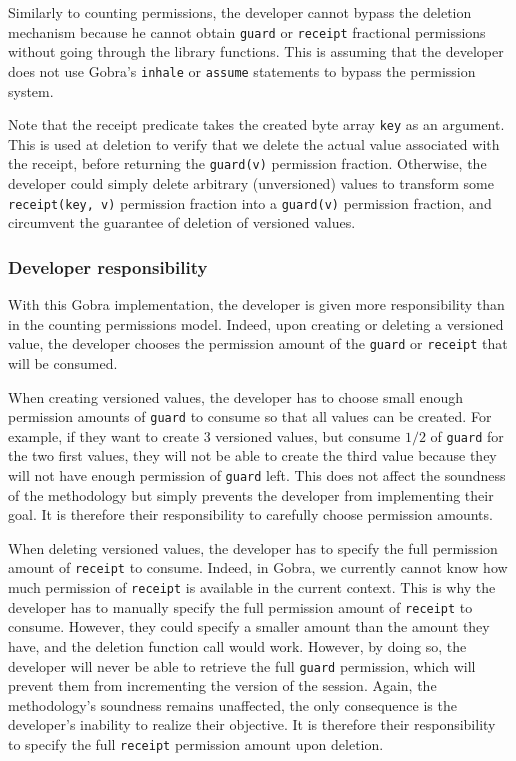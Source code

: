Similarly to counting permissions, the developer cannot bypass the deletion mechanism because he cannot obtain \texttt{guard} or \texttt{receipt} fractional permissions without going through the library functions.
This is assuming that the developer does not use Gobra's \texttt{inhale} or \texttt{assume} statements to bypass the permission system.

Note that the receipt predicate takes the created byte array \texttt{key} as an argument.
This is used at deletion to verify that we delete the actual value associated with the receipt, before returning the \texttt{guard(v)} permission fraction. Otherwise, the developer could simply delete arbitrary (unversioned) values to transform some \texttt{receipt(key, v)} permission fraction into a \texttt{guard(v)} permission fraction, and circumvent the guarantee of deletion of versioned values.

\subsubsection{Developer responsibility}
\label{sec:developer-responsibility}

With this Gobra implementation, the developer is given more responsibility than in the counting permissions model.
Indeed, upon creating or deleting a versioned value, the developer chooses the permission amount of the \texttt{guard} or \texttt{receipt} that will be consumed.

When creating versioned values, the developer has to choose small enough permission amounts of \texttt{guard} to consume so that all values can be created.
For example, if they want to create $3$ versioned values, but consume $1/2$ of \texttt{guard} for the two first values, they will not be able to create the third value because they will not have enough permission of \texttt{guard} left.
This does not affect the soundness of the methodology but simply prevents the developer from implementing their goal.
It is therefore their responsibility to carefully choose permission amounts.

When deleting versioned values, the developer has to specify the full permission amount of \texttt{receipt} to consume.
Indeed, in Gobra, we currently cannot know how much permission of \texttt{receipt} is available in the current context.
This is why the developer has to manually specify the full permission amount of \texttt{receipt} to consume.
However, they could specify a smaller amount than the amount they have, and the deletion function call would work.
However, by doing so, the developer will never be able to retrieve the full \texttt{guard} permission, which will prevent them from incrementing the version of the session.
Again, the methodology's soundness remains unaffected, the only consequence is the developer's inability to realize their objective.
It is therefore their responsibility to specify the full \texttt{receipt} permission amount upon deletion.

